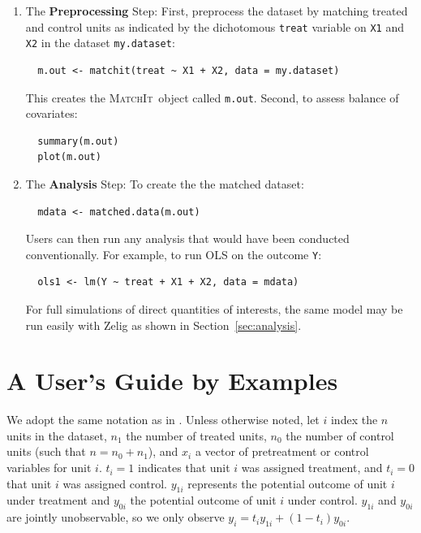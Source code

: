 \documentclass[oneside,letterpaper,titlepage]{article}
\newcommand{\MatchIt}{\textsc{MatchIt}}
\begin{document}
\begin{enumerate}
  
\item The {\bf Preprocessing} Step: First, preprocess the dataset by matching
  treated and control units as indicated by the dichotomous
  \texttt{treat} variable on \texttt{X1} and \texttt{X2} in the
  dataset \texttt{my.dataset}:
\begin{verbatim}
  m.out <- matchit(treat ~ X1 + X2, data = my.dataset)
\end{verbatim}
  This creates the \MatchIt\ object called \texttt{m.out}.  Second, to
  assess balance of covariates:
\begin{verbatim}
  summary(m.out)
  plot(m.out)
\end{verbatim}

\item The {\bf  Analysis} Step: To create the the matched dataset: 
\begin{verbatim}
  mdata <- matched.data(m.out)
\end{verbatim}
  Users can then run any analysis that would have been conducted
  conventionally.  For example, to run OLS on the outcome \texttt{Y}:
\begin{verbatim}
  ols1 <- lm(Y ~ treat + X1 + X2, data = mdata)
\end{verbatim}
For full simulations of direct quantities of interests, the same model
may be run easily with Zelig as shown in Section~\ref{sec:analysis}.
\end{enumerate}


\section{A User's Guide by Examples}
\label{methods}

We adopt the same notation as in \citet{HoImaKin05}. Unless otherwise
noted, let $i$ index the $n$ units in the dataset, $n_1$ the number of
treated units, $n_0$ the number of control units (such that
$n=n_0+n_1$), and $x_i$ a vector of pretreatment or control variables
for unit $i$.  $t_i=1$ indicates that unit $i$ was assigned treatment,
and $t_i=0$ that unit $i$ was assigned control.  $y_{1i}$ represents
the potential outcome of unit $i$ under treatment and $y_{0i}$ the
potential outcome of unit $i$ under control.  $y_{1i}$ and $y_{0i}$
are jointly unobservable, so we only observe
$y_i=t_iy_{1i}+(1-t_i)y_{0i}$.
\end{document}
